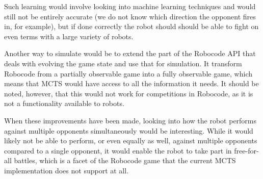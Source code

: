 Such learning would involve looking into machine learning techniques and would still not be entirely accurate (we do not know which direction the opponent fires in, for example), but if done correctly the robot should should be able to fight on even terms with a large variety of robots.

Another way to simulate would be to extend the part of the Robocode API that deals with evolving the game state and use that for simulation. It transform Robocode from a partially observable game into a fully observable game, which means that MCTS would have access to all the information it needs. It should be noted, however, that this would not work for competitions in Robocode, as it is not a functionality available to robots.

When these improvements have been made, looking into how the robot performs against multiple opponents simultaneously would be interesting. While it would likely not be able to perform, or even equally as well, against multiple opponents compared to a single opponent, it would enable the robot to take part in free-for-all battles, which is a facet of the Robocode game that the current MCTS implementation does not support at all.

